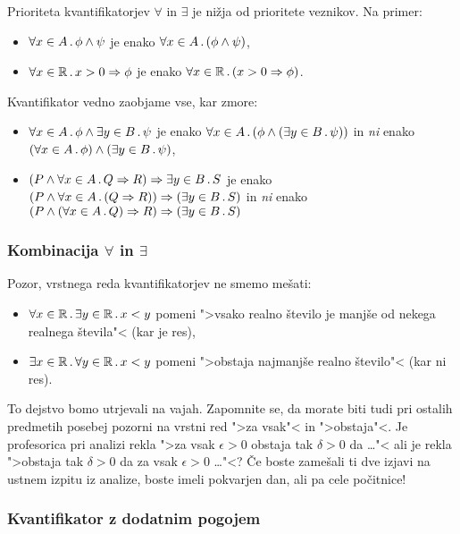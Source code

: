 Prioriteta kvantifikatorjev $\forall$ in $\exists$ je nižja od prioritete veznikov. Na primer:
%
\begin{itemize}
\item $\forall x \in A \,.\, \phi \land \psi$ je enako $\forall x \in A \,.\, (\phi \land \psi)$,
\item $\forall x \in \mathbb{R} \,.\, x > 0 \Rightarrow \phi$ je enako $\forall x \in \mathbb{R} \,.\, (x > 0 \Rightarrow \phi)$.
\end{itemize}
% 
Kvantifikator vedno zaobjame vse, kar zmore:
%
\begin{itemize}
\item $\forall x \in A \,.\, \phi \land \exists y \in B \,.\, \psi$ je enako $\forall x \in A \,.\, (\phi \land (\exists y \in B \,.\, \psi))$ in \emph{ni} enako $(\forall x \in A \,.\, \phi) \land (\exists y \in B \,.\, \psi)$,

\item $(P \land \forall x \in A \,.\, Q \Rightarrow R) \Rightarrow \exists y \in B \,.\, S$ je enako $(P \land \forall x \in A \,.\,  (Q \Rightarrow R)) \Rightarrow (\exists y \in B \,.\, S)$ in \emph{ni} enako 
  $(P \land (\forall x \in A \,.\, Q) \Rightarrow R) \Rightarrow (\exists y \in B \,.\, S)$
\end{itemize}

\subsubsection{Kombinacija $\forall$ in $\exists$}

Pozor, vrstnega reda kvantifikatorjev ne smemo mešati:
%
\begin{itemize}
\item $\forall x \in \mathbb{R} \,.\, \exists y \in \mathbb{R} \,.\, x < y$ pomeni ">vsako realno število je manjše od nekega realnega števila"< (kar je res),
\item $\exists x \in \mathbb{R} \,.\, \forall y \in \mathbb{R} \,.\, x < y$ pomeni ">obstaja najmanjše realno število"< (kar ni res).
\end{itemize}
%
To dejstvo bomo utrjevali na vajah. Zapomnite se, da morate biti tudi pri ostalih predmetih posebej pozorni na vrstni red
">za vsak"< in ">obstaja"<. Je profesorica pri analizi rekla ">za vsak $\epsilon > 0$ obstaja tak $\delta > 0$ da \dots"< ali je rekla ">obstaja tak $\delta > 0$ da za vsak $\epsilon > 0$ \dots"<? Če boste zamešali ti dve izjavi na ustnem izpitu iz analize, boste imeli pokvarjen dan, ali pa cele počitnice!


\subsubsection{Kvantifikator z dodatnim pogojem}

